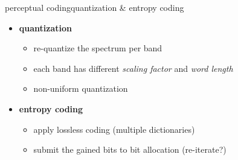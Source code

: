 	\begin{frame}{perceptual coding}{quantization \& entropy coding}
		\begin{itemize}
			\item	\textbf{quantization}
				\begin{itemize}
					\item	re-quantize the spectrum per band
					\item	each band has different \textit{scaling factor} and \textit{word length}
                    \item   non-uniform quantization
				\end{itemize}
			\pause
			\bigskip
            \item	\textbf{entropy coding}
				\begin{itemize}
					\item	apply lossless coding (multiple dictionaries)
					\item	submit the gained bits to bit allocation (re-iterate?)
				\end{itemize}
		\end{itemize}
	\end{frame}

